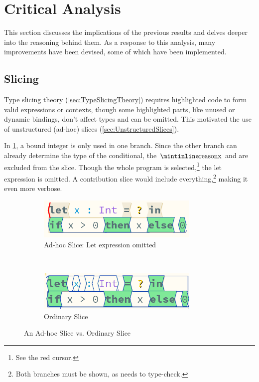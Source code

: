 \section{Critical Analysis}\label{sec:CriticalAnalysis}
This section discusses the implications of the previous results and delves deeper into the reasoning behind them. As a response to this analysis, many improvements have been devised, some of which have been implemented.
\subsection{Slicing}\label{sec:SlicingAnalysis}
Type slicing theory (\cref{sec:TypeSlicingTheory}) requires highlighted code to form valid expressions or contexts, though some highlighted parts, like unused or dynamic bindings, don't affect types and can be omitted. This motivated the use of unstructured (ad-hoc) slices (\cref{sec:UnstructuredSlices}).

In \cref{fig:LetSliceOmitted}, a bound integer  is only used in one branch. Since the other branch can already determine the type of the conditional, the $\code{x}$  and  are excluded from the slice. Though the whole program is selected,\footnote{See the red cursor.} the let expression is omitted. A contribution slice would include everything,\footnote{Both branches must be shown, as  needs to type-check.} making it even more verbose.
\begin{figure}
\centering
\begin{subfigure}{0.45\textwidth}
\centering

\includegraphics[width=0.85\textwidth]{Media/Figures/Unused_let}
\caption{Ad-hoc Slice: Let expression omitted}
\end{subfigure}$\qquad$
\begin{subfigure}{0.45\textwidth}
\centering

\includegraphics[width=0.85\textwidth]{Media/Figures/Unused_let_ordinary}
\caption{Ordinary Slice}
\end{subfigure}

\caption{An Ad-hoc Slice vs. Ordinary Slice}
\label{fig:LetSliceOmitted}
\end{figure}


